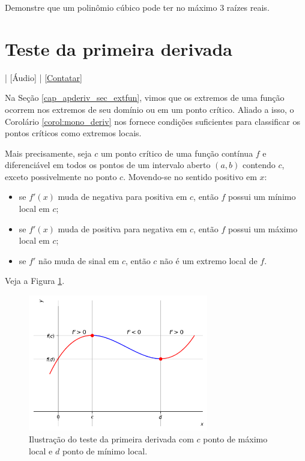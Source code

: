 \begin{exer}
  Demonstre que um polinômio cúbico pode ter no máximo $3$ raízes reais.
\end{exer}

\section{Teste da primeira derivada}\label{cap_apderiv_sec_tder1}

\begin{flushright}
  [Vídeo] | [Áudio] | \href{https://phkonzen.github.io/notas/contato.html}{[Contatar]}
\end{flushright}

Na Seção \ref{cap_apderiv_sec_extfun}, vimos que os extremos de uma função ocorrem nos extremos de seu domínio ou em um ponto crítico. Aliado a isso, o Corolário \ref{corol:mono_deriv} nos fornece condições suficientes para classificar os pontos críticos como extremos locais.

Mais precisamente, seja $c$ um ponto crítico de uma função contínua $f$ e diferenciável em todos os pontos de um intervalo aberto $(a, b)$ contendo $c$, exceto possivelmente no ponto $c$. Movendo-se no sentido positivo em $x$:
\begin{itemize}
\item se $f'(x)$ muda de negativa para positiva em $c$, então $f$ possui um mínimo local em $c$;
\item se $f'(x)$ muda de positiva para negativa em $c$, então $f$ possui um máximo local em $c$;
\item se $f'$ não muda de sinal em $c$, então $c$ não é um extremo local de $f$.
\end{itemize}
Veja a Figura \ref{fig:tder1}.

\begin{figure}[H]
  \centering
  \includegraphics[width=0.7\textwidth]{./cap_apderiv/dados/fig_tder1/fig_tder1}
  \caption{Ilustração do teste da primeira derivada com $c$ ponto de máximo local e $d$ ponto de mínimo local.}
  \label{fig:tder1}
\end{figure}

